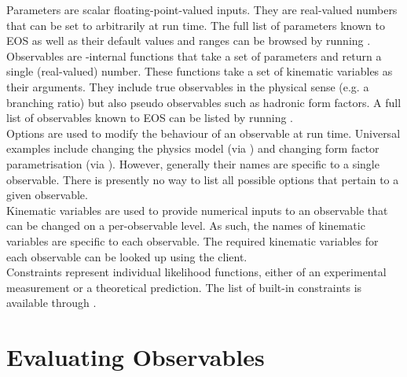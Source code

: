 Parameters are scalar floating-point-valued inputs. They are real-valued
numbers that can be set to arbitrarily at run time.  The full list of
parameters known to EOS as well as their default values and ranges can be browsed
by running .\\

Observables are \EOS-internal functions that take a set of parameters and return a single
(real-valued) number. These functions take a set of kinematic variables as their arguments.
They include true observables in the physical sense (e.g.
a branching ratio) but also pseudo observables such as hadronic form factors.
A full list of observables known to EOS can be listed by running
.\\

Options are used to modify the behaviour of an observable at run time.
Universal examples include changing the physics model (via ) and
changing form factor parametrisation (via ). However,
generally their names are specific to a single observable. There is presently
no way to list all possible options that pertain to a given observable.\\

Kinematic variables are used to provide numerical inputs to an observable that can
be changed on a per-observable level. As such, the names of kinematic variables are
specific to each observable. The required kinematic variables for each observable
can be looked up using the  client.\\

Constraints represent individual likelihood functions, either of
an experimental measurement or a theoretical prediction. The list of built-in
constraints is available through .


\section{Evaluating Observables}
\label{sec:usage:eos-evaluate}

